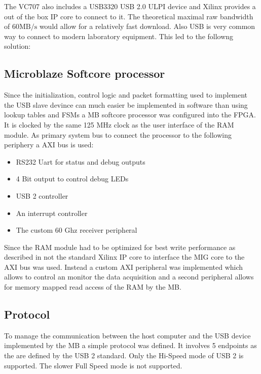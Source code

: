The VC707 also includes a USB3320 USB 2.0 ULPI device and Xilinx provides
a out of the box \gls{IP} core to connect to it. The theoretical maximal
raw bandwidth of $60 \text{MB}/\text{s}$ would allow for a relatively fast
download. Also \gls{USB} is very common way to connect to modern laboratory
equipment. This led to the followng solution:

\subsection{Microblaze Softcore processor}
Since the initialization, control logic and packet formatting
used to implement the \gls{USB} slave devince 
can much easier be implemented in software than using lookup tables and
\glspl{FSM} a \gls{MB} softcore processor was configured into the \gls{FPGA}.
It is clocked by the same 125 MHz clock as the user interface of the \gls{RAM}
module. As primary system bus to connect the processor to the following periphery
a \gls{AXI} bus is used:
\begin{itemize}
\item RS232 Uart for status and debug outputs
\item 4 Bit output to control debug \glspl{LED}
\item USB 2 controller
\item An interrupt controller
\item The custom 60 Ghz receiver peripheral
\end{itemize}

Since the \gls{RAM} module had to be optimized for best write performance
as described in  not the standard Xilinx \gls{IP}
core to interface the \gls{MIG} core to the \gls{AXI} bus was used.
Instead a custom \gls{AXI} peripheral was implemented which allows to
control an monitor the data acquisition and a second peripheral allows
for memory mapped read access of the \gls{RAM} by the \gls{MB}.

\subsection{Protocol}
To manage the communication between the host computer and the \gls{USB} device
implemented by the \gls{MB} a simple protocol was defined.
It involves 5 endpoints as the are defined by the \gls{USB} 2 standard.
Only the Hi-Speed mode of \gls{USB} 2 is supported. The slower Full Speed mode 
is not supported. \\

